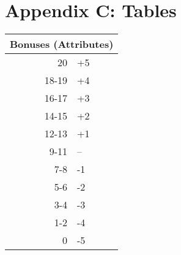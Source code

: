 \chapter{Appendix C: Tables}

\begin{tabular}{ |r|l| }
  \hline
  \multicolumn{2}{|c|}{Bonuses (Attributes)} \\
  \hline
  20 & +5 \\
  18-19 & +4 \\
  16-17 & +3 \\
  14-15 & +2 \\
  12-13 & +1 \\
  9-11 & -- \\
  7-8 & -1 \\
  5-6 & -2 \\
  3-4 & -3 \\
  1-2 & -4 \\
  0 & -5 \\
  \hline
\end{tabular}
